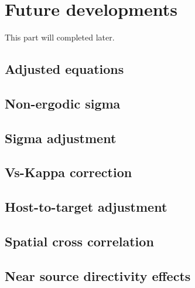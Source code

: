 \clearpage
%
\section{Future developments}
This part will completed later.
%
\subsection{Adjusted equations}
%
\subsection{Non-ergodic sigma}
%
\subsection{Sigma adjustment}
%
\subsection{Vs-Kappa correction}
%
\subsection{Host-to-target adjustment}
%
\subsection{Spatial cross correlation}
%
\subsection{Near source directivity effects}

